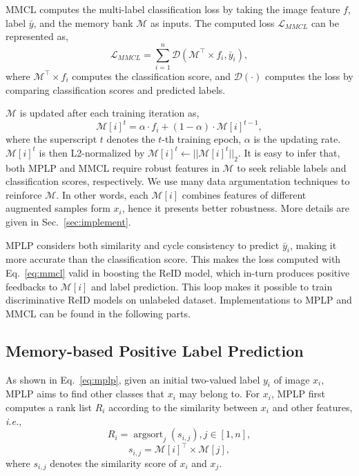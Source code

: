 \documentclass[10pt,twocolumn,letterpaper]{article}
\begin{document}
MMCL computes the multi-label classification loss by taking the image feature $f$, label $\bar y$, and the memory bank $\mathcal{M}$ as inputs. The computed loss $\mathcal{L}_{MMCL}$ can be represented as,
\begin{equation}\label{eq:mmcl}
\mathcal{L}_{MMCL} = \sum_{i=1}^{n} \mathcal D(\mathcal{M}^\top \times f_i, \bar y_i),
\end{equation}
where $\mathcal{M}^\top \times f_i$ computes the classification score, and $\mathcal D(\cdot)$ computes the loss by comparing classification scores and predicted labels.

$\mathcal{M}$ is updated after each training iteration as,
\begin{equation}
\mathcal{M}[i]^t = \alpha \cdot f_i + (1-\alpha) \cdot \mathcal{M}[i]^{t-1},
\end{equation}
where the superscript $t$ denotes the $t$-th training epoch, $\alpha$ is the updating rate. $\mathcal{M}[i]^t$ is then L2-normalized by $\mathcal{M}[i]^t \leftarrow||\mathcal{M}[i]^t||_2$. It is easy to infer that, both MPLP and MMCL require robust features in $\mathcal{M}$ to seek reliable labels and classification scores, respectively. We use many data argumentation techniques to reinforce $\mathcal{M}$. In other words, each $\mathcal{M}[i]$ combines features of different augmented samples form $x_i$, hence it presents better robustness. More details are given in Sec.~\ref{sec:implement}.

MPLP considers both similarity and cycle consistency to predict $\bar y_i$, making it more accurate than the classification score. This makes the loss computed with Eq.~\eqref{eq:mmcl} valid in boosting the ReID model, which in-turn produces positive feedbacks to $\mathcal{M}[i]$ and label prediction. This loop makes it possible to train discriminative ReID models on unlabeled dataset. Implementations to MPLP and MMCL can be found in the following parts.

\subsection{Memory-based Positive Label Prediction}\label{section:mplp}

As shown in Eq.~\eqref{eq:mplp}, given an initial two-valued label $y_i$ of image $x_i$, MPLP aims to find other classes that $x_i$ may belong to. For $x_i$, MPLP first computes a rank list ${R}_{i}$ according to the similarity between $x_i$ and other features, \emph{i.e.},
\begin{equation}\label{eq:labelrank}
{R}_{i} = \mathop{\arg \operatorname {sort}}_j (s_{i,j}), j \in [1,n],
\end{equation}
\begin{equation}\label{eq:mem_sim}
s_{i,j} = \mathcal{M}[i]^\top \times \mathcal{M}[j],
\end{equation}
where $s_{i,j}$ denotes the similarity score of $x_i$ and $x_j$.
\end{document}
